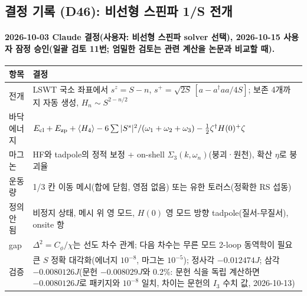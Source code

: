 \subsection{결정 기록 (D46): 비선형 스핀파 1/S 전개}\label{decisions-d46-nlswt}
\begingroup%
  \framesubtitle{2026-10-03 Claude 결정(사용자: 비선형 스핀파 solver 선택), 2026-10-15 사용자 잠정 승인(일괄 검토 11번; 엄밀한 검토는 관련 계산을 논문과 비교할 때).}
  \small\renewcommand{\arraystretch}{1.12}
  \begin{tabularx}{\textwidth}{@{}P{3.0cm}Y@{}}
    \toprule
    항목 & 결정 \\
    \midrule
    전개 & LSWT 국소 좌표에서 $s^z=S-n$, $s^+=\sqrt{2S}\,[a-a^\dagger aa/4S]$; 보존 4개까지 자동 생성, $H_n\sim S^{2-n/2}$ \\
    바닥 에너지 & $E_{\rm cl}+E_{\rm zp}+\langle H_4\rangle-6\sum|S^s|^2/(\omega_1+\omega_2+\omega_3)-\tfrac12\zeta^\dagger H(0)^+\zeta$ \\
    마그논 & HF와 tadpole의 정적 보정 + on-shell $\Sigma_3(k,\omega_n)$(붕괴·원천), 확산 $\eta$로 붕괴율 \\
    운동량 & 1/3 칸 이동 메시(합에 닫힘, 영점 없음) 또는 유한 토러스(정확한 RS 섭동) \\
    정의 안 됨 & 비정지 상태, 메시 위 영 모드, $H(0)$ 영 모드 방향 tadpole(질서-무질서), onsite 항 \\
    gap & $\Delta^2=C_\phi/\chi$는 선도 차수 관계; 다음 차수는 무른 모드 2-loop 동역학이 필요 \\
    검증 & 큰 $S$ 정확 대각화(에너지 $10^{-8}$, 마그논 $10^{-5}$); 정사각 $-0.012474J$; 삼각 $-0.0080126J$(문헌 $-0.008029J$와 0.2\%: 문헌 식을 독립 계산하면 $-0.0080126J$로 패키지와 $10^{-8}$ 일치, 차이는 문헌의 $I_3$ 수치 값, 2026-10-13) \\
    \bottomrule
  \end{tabularx}
\endgroup


